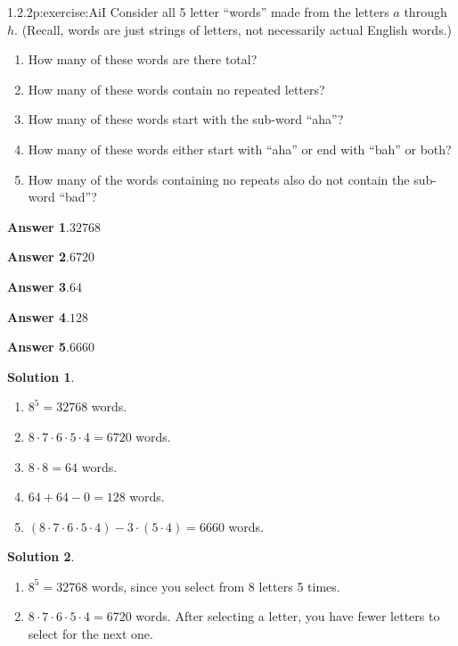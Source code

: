 \documentclass[twoside,11pt,]{book}
\newcommand{\blocktitlefont}{\relax}
\numberwithin{equation}{chapter}
\begin{document}
\begin{divisionsolution}{1.2.2}{}{p:exercise:AiI}%
Consider all 5 letter ``words'' made from the letters \(a\) through \(h\text{.}\) (Recall, words are just strings of letters, not necessarily actual English words.)%
\begin{enumerate}[label=(\alph*)]
\item{}How many of these words are there total?%
\item{}How many of these words contain no repeated letters?%
\item{}How many of these words start with the sub-word ``aha''?%
\item{}How many of these words either start with ``aha'' or end with ``bah'' or both?%
\item{}How many of the words containing no repeats also do not contain the sub-word ``bad''?%
\end{enumerate}
%
\par\smallskip%
\noindent\textbf{\blocktitlefont Answer 1}.\quad{}\(32768\)%
\par\smallskip%
\noindent\textbf{\blocktitlefont Answer 2}.\quad{}\(6720\)%
\par\smallskip%
\noindent\textbf{\blocktitlefont Answer 3}.\quad{}\(64\)%
\par\smallskip%
\noindent\textbf{\blocktitlefont Answer 4}.\quad{}\(128\)%
\par\smallskip%
\noindent\textbf{\blocktitlefont Answer 5}.\quad{}\(6660\)%
\par\smallskip%
\noindent\textbf{\blocktitlefont Solution 1}.\quad{}%
\begin{enumerate}[label=(\alph*)]
\item{}\(8^5 = 32768\) words.%
\item{}\(8\cdot 7\cdot 6\cdot 5\cdot 4 = 6720\) words.%
\item{}\(8 \cdot 8 =64\) words.%
\item{}\(64 + 64 - 0 = 128\) words.%
\item{}\((8\cdot 7\cdot 6\cdot 5\cdot 4) - 3\cdot (5\cdot 4) = 6660\) words.%
\end{enumerate}
%
\par\smallskip%
\noindent\textbf{\blocktitlefont Solution 2}.\quad{}%
\begin{enumerate}[label=(\alph*)]
\item{}\(8^5 = 32768\) words, since you select from 8 letters 5 times.%
\item{}\(8\cdot 7\cdot 6\cdot 5\cdot 4 = 6720\) words. After selecting a letter, you have fewer letters to select for the next one.%

\end{enumerate}
\end{divisionsolution}
\end{document}
